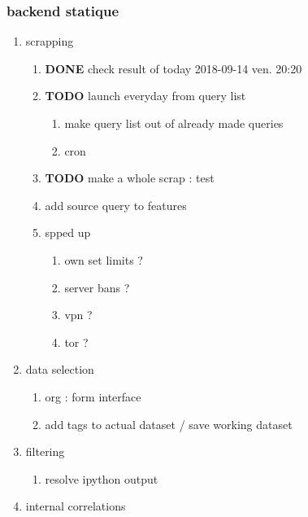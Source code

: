 \documentclass[11pt]{article}
\begin{document}
\subsubsection{backend statique}
\label{sec:org691c524}
\begin{enumerate}
\item scrapping
\label{sec:orgcac2f9b}
\begin{enumerate}
\item {\bfseries\sffamily DONE} check result of today 2018-09-14 ven. 20:20
\label{sec:orge7bfd37}
\item {\bfseries\sffamily TODO} launch everyday from query list
\label{sec:orgacae68d}
\begin{enumerate}
\item make query list out of already made queries
\label{sec:org1fa14f0}
\item cron
\label{sec:org854d5c2}
\end{enumerate}
\item {\bfseries\sffamily TODO} make a whole scrap : test
\label{sec:orgaad5a68}
\item add source query to features
\label{sec:org13f35ec}
\item spped up
\label{sec:orgaf8e9c1}
\begin{enumerate}
\item own set limits ?
\label{sec:org755b4d4}
\item server bans ?
\label{sec:orgf9fcc6b}
\item vpn ?
\label{sec:orga54aab5}
\item tor ?
\label{sec:orga7c5e2e}
\end{enumerate}
\end{enumerate}
\item data selection
\label{sec:orgb532a8f}
\begin{enumerate}
\item org : form interface
\label{sec:orgd04fcb2}
\item add tags to actual dataset / save working dataset
\label{sec:org3458104}
\end{enumerate}
\item filtering
\label{sec:org49c0658}
\begin{enumerate}
\item resolve ipython output
\label{sec:org706541a}
\end{enumerate}
\item internal correlations
\label{sec:org6826367}
\begin{enumerate}

\end{enumerate}
\end{enumerate}
\end{document}
